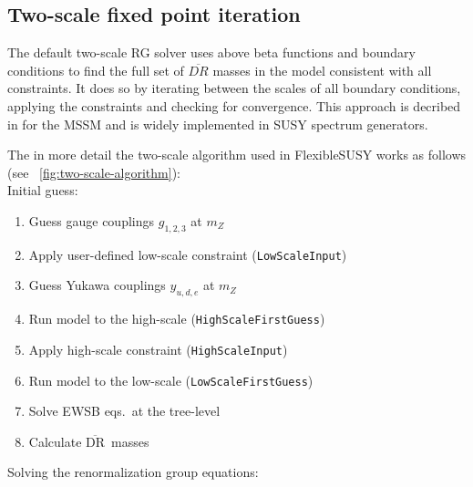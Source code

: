 \documentclass[final,3p,times,pdflatex]{elsarticle}
\newcommand{\fs}{FlexibleSUSY\xspace}
\newcommand{\code}[1]{\lstinline|#1|}  %
\newcommand{\textoverline}[1]{$\overline{\mbox{#1}}$}
\newcommand{\DRbar}{\textoverline{DR}\xspace}
\begin{document}
\subsection{Two-scale fixed point iteration}
The default two-scale RG solver uses above beta functions and boundary
conditions to find the full set of $\overline{DR}$ masses in the model
consistent with all constraints.  It does so by iterating between the
scales of all boundary conditions, applying the constraints and
checking for convergence.  This approach is decribed in
\cite{Barger:1993gh} for the MSSM and is widely implemented in SUSY
spectrum generators.

The in more detail the two-scale algorithm used in \fs works as
follows (see \figurename~\ref{fig:two-scale-algorithm}):
%
\\Initial guess:
\begin{enumerate}
\item Guess gauge couplings $g_{1,2,3}$ at $m_Z$
\item Apply user-defined low-scale constraint (\code{LowScaleInput})
\item Guess Yukawa couplings $y_{u,d,e}$ at $m_Z$
\item Run model to the high-scale (\code{HighScaleFirstGuess})
\item Apply high-scale constraint (\code{HighScaleInput})
\item Run model to the low-scale (\code{LowScaleFirstGuess})
\item Solve EWSB eqs.\ at the tree-level
\item Calculate \DRbar\ masses
\end{enumerate}
%
Solving the renormalization group equations:
\end{document}
